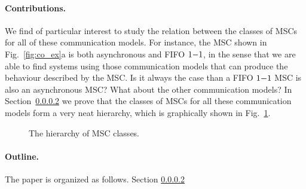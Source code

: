 \paragraph{Contributions.}

We find of particular interest to study the relation between the classes of MSCs for all of these communication models. For instance, the MSC shown in Fig.~\ref{fig:co_ex}a is both asynchronous and FIFO $1\mathsf{-}1$, in the sense that we are able to find systems using those communication models that can produce the behaviour described by the MSC. Is it always the case than a FIFO $1\mathsf{-}1$ MSC is also an asynchronous MSC? What about the other communication models? In Section~\ref{} we prove that the classes of MSCs for all these communication models form a very neat hierarchy, which is graphically shown in Fig.~\ref{fig:msc_hierarchy_full}.


\begin{figure}[h]
	\centering
	\caption{The hierarchy of MSC classes.}
	\label{fig:msc_hierarchy_full}
\end{figure}



\paragraph{Outline.} The paper is organized as follows. Section \ref{}
